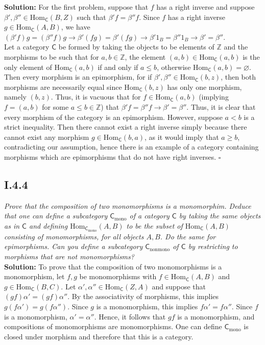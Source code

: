 \documentclass[11pt,a4paper]{article}
\newcommand{\morph}[3]{\text{Hom}_{#1}(#2,#3)}
\begin{document}
\noindent \textbf{Solution: } For the first problem, suppose that $f$ has a right inverse and suppose $\beta', \beta'' \in \morph{\textsf{C}}{B}{Z}$ such that $\beta' f = \beta'' f$. Since $f$ has a right inverse $g \in \morph{\textsf{C}}{A}{B}$, we have $(\beta' f) g = (\beta'' f)g \rightarrow \beta'(fg) = \beta'(fg) \rightarrow \beta' 1_B = \beta'' 1_B \rightarrow \beta' = \beta''$.
\\

\noindent Let a category $\textsf{C}$ be formed by taking the objects to be elements of $\mathbb{Z}$ and the morphisms to be such that for $a,b\in \mathbb{Z}$, the element $(a,b) \in \morph{\textsf{C}}{a}{b}$ is the only element of $\morph{\textsf{C}}{a}{b}$ if and only if $a \leq b$, otherwise $\morph{\textsf{C}}{a}{b} = \varnothing$.  Then every morphism is an epimorphism, for if $\beta', \beta'' \in \morph{\textsf{C}}{b}{z}$, then both morphisms are necessarily equal since $\morph{\textsf{C}}{b}{z}$ has only one morphism, namely $(b,z)$.  Thus, it is vacuous that for $f \in \morph{\textsf{C}}{a}{b}$ (implying $f = (a,b)$ for some $a \leq b \in \mathbb{Z}$) that $\beta'f = \beta''f \rightarrow \beta' = \beta''$.  Thus, it is clear that every morphism of the category is an epimorphism.  However, suppose $a < b$ is a strict inequality.  Then there cannot exist a right inverse simply because there cannot exist any morphism $g \in \morph{\textsf{C}}{b}{a}$, as it would imply that $a \geq b$, contradicting our assumption, hence there is an example of a category containing morphisms which are epimorphisms that do not have right inverses. $\square$

\subsection*{I.4.4}\textit{Prove that the composition of two monomorphisms is a monomorphim.  Deduce that one can define a subcategory $\textsf{C}_{\text{mono}}$ of a category $\textsf{C}$ by taking the same objects as in $\textsf{C}$ and defining $\morph{\textsf{C}_{\text{mono}}}{A}{B}$ to be the subset of $\morph{\textsf{C}}{A}{B}$ consisting of monomorphisms, for all objects $A,B$.  Do the same for epimorphisms. Can you define a subcategory $\textsf{C}_{\text{nonmono}}$ of $\textsf{C}$ by restricting to morphisms that are not monomorphisms?}\\

\noindent\textbf{Solution: } To prove that the composition of two monomorphisms is a monomorphism, let $f, g$ be monomorphisms with $f \in \morph{\textsf{C}}{A}{B}$ and $g \in \morph{\textsf{C}}{B}{C}$.  Let $\alpha',\alpha'' \in \morph{\textsf{C}}{Z}{A}$ and suppose that $(gf)\alpha' = (gf)\alpha''$.  By the associativity of morphisms, this implies $g(f \alpha') =  g(f \alpha'')$.  Since $g$ is a monomorphism, this implies $f\alpha' = f\alpha''$.  Since $f$ is a monomorphism, $\alpha' = \alpha''$.  Hence, it follows that $gf$ is a monomorphism, and compositions of monomorphisms are monomorphisms. One can define $\textsf{C}_{\text{mono}}$ is closed under morphism and therefore that this is a category.\\
\end{document}
